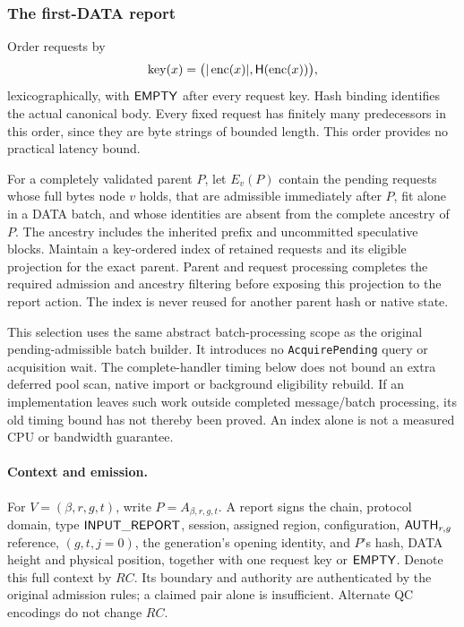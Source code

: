 \subsubsection{The first-DATA report}
\label{sec:input-report}
Order requests by
\[
 \operatorname{key}(x)=
   \bigl(|\operatorname{enc}(x)|,\mathsf H(\operatorname{enc}(x))\bigr),
\]
lexicographically, with $\mathsf{EMPTY}$ after every request key. Hash binding
identifies the actual canonical body. Every fixed request has finitely
many predecessors in this order, since they are byte strings of bounded
length. This order provides no practical latency bound.

For a completely validated parent $P$, let $E_v(P)$ contain the pending
requests whose full bytes node $v$ holds, that are admissible immediately
after $P$, fit alone in a DATA batch, and whose identities are absent from
the complete ancestry of $P$. The ancestry includes the inherited prefix
and uncommitted speculative blocks. Maintain a key-ordered index of
retained requests and its eligible projection for the exact parent.
Parent and request processing completes the required admission and
ancestry filtering before exposing this projection to the report action.
The index is never reused for another parent hash or native state.

This selection uses the same abstract batch-processing scope as the
original pending-admissible batch builder. It introduces no
\texttt{AcquirePending} query or acquisition wait. The complete-handler
timing below does not bound an extra deferred pool scan, native import
or background eligibility rebuild. If an implementation leaves such
work outside completed message/batch processing, its old timing bound
has not thereby been proved. An index alone is not a measured CPU or
bandwidth guarantee.

\paragraph{Context and emission.}
For $V=(\beta,r,g,t)$, write $P=A_{\beta,r,g,t}$. A report signs the chain,
protocol domain, type $\mathsf{INPUT\_REPORT}$, session, assigned region,
configuration, $\mathsf{AUTH}_{r,g}$ reference, $(g,t,j=0)$, the generation's
opening identity, and $P$'s hash, DATA height and physical position,
together with one request key or $\mathsf{EMPTY}$. Denote this full context
by $\mathit{RC}$. Its boundary and authority are authenticated by the
original admission rules; a claimed pair alone is insufficient.
Alternate QC encodings do not change $\mathit{RC}$.

